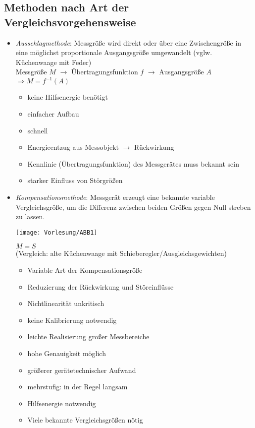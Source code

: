 \documentclass{scrreprt}
\begin{document}
\subsection{Methoden nach Art der Vergleichsvorgehensweise}
\begin{itemize}
\item \emph{Ausschlagmethode}: Messgröße wird direkt oder über eine Zwischengröße in eine möglichst proportionale Ausgangsgröße umgewandelt (vglw. Küchenwaage mit Feder)\\
Messgröße $M$ $\to$ Übertragungsfunktion $f$ $\to$ Ausgangsgröße $A$\\
$\Rightarrow \boxed{M = f^{-1}(A)}$
\begin{itemize}[label=$+$]
\item keine Hilfsenergie benötigt
\item einfacher Aufbau
\item schnell
\end{itemize}
\begin{itemize}[label=-]
\item Energieentzug aus Messobjekt $\to$ Rückwirkung
\item Kennlinie (Übertragungsfunktion) des Messgerätes muss bekannt sein
\item starker Einfluss von Störgrößen
\end{itemize}
\item \emph{Kompensationsmethode}: Messgerät erzeugt eine bekannte variable Vergleichsgröße, um die Differenz zwischen beiden Größen gegen Null streben zu lassen.
\begin{center}
\texttt{[image: Vorlesung/ABB1]}
\end{center}
$M=S$\\
(Vergleich: alte Küchenwaage mit Schieberegler/Ausgleichsgewichten)
\begin{itemize}[label=$+$]
\item Variable Art der Kompensationsgröße
\item Reduzierung der Rückwirkung und Störeinflüsse
\item Nichtlinearität unkritisch
\item keine Kalibrierung notwendig
\item leichte Realisierung großer Messbereiche
\item hohe Genauigkeit möglich
\end{itemize}
\begin{itemize}[label=$-$]
\item größerer gerätetechnischer Aufwand
\item mehrstufig: in der Regel langsam
\item Hilfsenergie notwendig
\item Viele bekannte Vergleichsgrößen nötig
\end{itemize}
\end{itemize}
\end{document}

